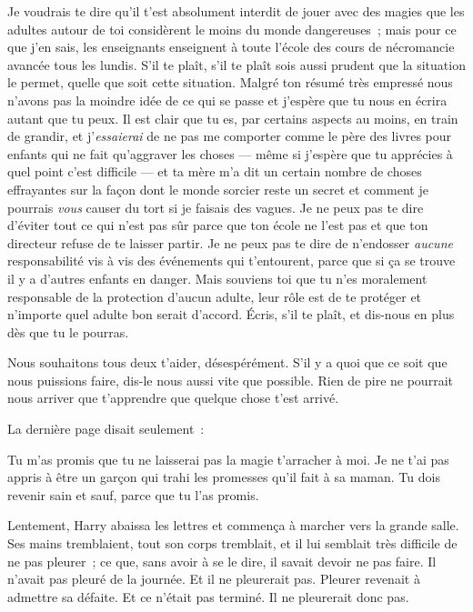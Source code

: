 \begin{writtenNote}
Je voudrais te dire qu'il t'est absolument interdit de jouer avec des magies que les adultes autour de toi considèrent le moins du monde dangereuses~; mais pour ce que j'en sais, les enseignants enseignent à toute l'école des cours de nécromancie avancée tous les lundis. S'il te plaît, s'il te plaît sois aussi prudent que la situation le permet, quelle que soit cette situation. Malgré ton résumé très empressé nous n'avons pas la moindre idée de ce qui se passe et j'espère que tu nous en écrira autant que tu peux. Il est clair que tu es, par certains aspects au moins, en train de grandir, et j'\emph{essaierai} de ne pas me comporter comme le père des livres pour enfants qui ne fait qu'aggraver les choses — même si j'espère que tu apprécies à quel point c'est difficile — et ta mère m'a dit un certain nombre de choses effrayantes sur la façon dont le monde sorcier reste un secret et comment je pourrais \emph{vous} causer du tort si je faisais des vagues. Je ne peux pas te dire d'éviter tout ce qui n'est pas sûr parce que ton école ne l'est pas et que ton directeur refuse de te laisser partir. Je ne peux pas te dire de n'endosser \emph{aucune} responsabilité vis à vis des événements qui t'entourent, parce que si ça se trouve il y a d'autres enfants en danger. Mais souviens toi que tu n'es moralement responsable de la protection d'aucun adulte, leur rôle est de te protéger et n'importe quel adulte bon serait d'accord. Écris, s'il te plaît, et dis-nous en plus dès que tu le pourras.

Nous souhaitons tous deux t'aider, désespérément. S'il y a quoi que ce soit que nous puissions faire, dis-le nous aussi vite que possible. Rien de pire ne pourrait nous arriver que t'apprendre que quelque chose t'est arrivé.

\end{writtenNote}

La dernière page disait seulement~:

\begin{writtenNote}
Tu m'as promis que tu ne laisserai pas la magie t'arracher à moi. Je ne t'ai pas appris à être un garçon qui trahi les promesses qu'il fait à sa maman. Tu dois revenir sain et sauf, parce que tu l'as promis.

\end{writtenNote}

Lentement, Harry abaissa les lettres et commença à marcher vers la grande salle. Ses mains tremblaient, tout son corps tremblait, et il lui semblait très difficile de ne pas pleurer~; ce que, sans avoir à se le dire, il savait devoir ne pas faire. Il n'avait pas pleuré de la journée. Et il ne pleurerait pas. Pleurer revenait à admettre sa défaite. Et ce n'était pas terminé. Il ne pleurerait donc pas.

